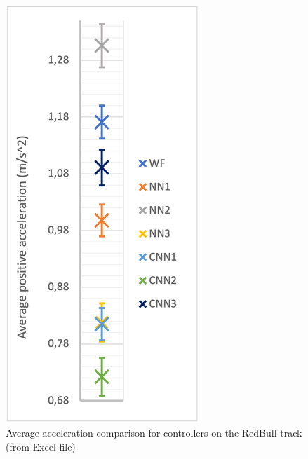 \begin{figure}
    \centering
    \begin{minipage}{0.45\textwidth}
        \centering
        \includegraphics[width=0.65\textwidth]{Figures/H1_accel.png}
        \caption{Average acceleration comparison for controllers on the RedBull track (from Excel file)}
        \label{h1_accel}
    \end{minipage}\hfill
    \begin{minipage}{0.45\textwidth}
        \centering

\end{minipage}
\end{figure}

